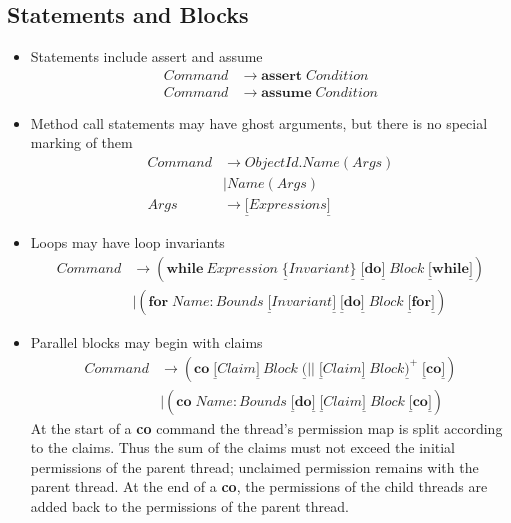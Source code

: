 \documentclass{article}%
\begin{document}
\subsection{Statements and Blocks}

\begin{itemize}
\item Statements include assert and assume%
\begin{align*}
Command  &  \rightarrow\mathbf{assert}\;Condition\\
Command  &  \rightarrow\mathbf{assume}\;Condition
\end{align*}


\item Method call statements may have ghost arguments, but there is no special
marking of them%
\begin{align*}
Command  &  \rightarrow ObjectId.Name(Args)\\
&  \mid Name(Args)\\
Args  &  \rightarrow\underline{[}Expressions\underline{]}%
\end{align*}


\item Loops may have loop invariants%
\begin{align*}
Command  &  \rightarrow\left(  \mathbf{while}~Expression\;\underline{\{}%
Invariant\underline{\}}\;\underline{[}\mathbf{do}\underline{]}%
\;Block\;\underline{[}\mathbf{while}\underline{]}\right) \\
&  \mid\left(  \mathbf{for}\;Name:Bounds\;\underline{[}Invariant\underline{]}%
\;\underline{[}\mathbf{do}\underline{]}\;Block\;\underline{[}\mathbf{for}%
\underline{]}\right)
\end{align*}


\item Parallel blocks may begin with claims%
\begin{align*}
Command &  \rightarrow\left(  \mathbf{co}\;\underline{[}Claim\underline{]}%
\ Block\;\underline{(}||\;\underline{[}Claim\underline{]}\;Block\underline{)}%
^{+}\;\underline{[}\mathbf{co}\underline{]}\right)  \\
&  \mid\left(  \mathbf{co}\;Name:Bounds\;\underline{[}\mathbf{do}%
\underline{]}\;\underline{[}Claim\underline{]}\;Block\;\underline{[}%
\mathbf{co}\underline{]}\right)
\end{align*}
At the start of a \textbf{co} command the thread's permission map is split
according to the claims. Thus the sum of the claims must not exceed the
initial permissions of the parent thread; unclaimed permission remains with
the parent thread. At the end of a \textbf{co}, the permissions of the child
threads are added back to the permissions of the parent thread.


\end{itemize}
\end{document}
